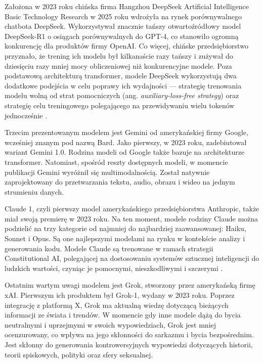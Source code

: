         Założona w 2023 roku chińska firma Hangzhou DeepSeek Artificial Intelligence Basic Technology Research w 2025 roku wdrożyła na rynek porównywalnego chatbota DeepSeek. Wykorzystywał znacznie tańszy otwartoźródłowy model DeepSeek-R1 o osiągach porównywalnych do GPT-4, co stanowiło ogromną konkurencję dla produktów firmy OpenAI. Co więcej, chińske przedsiębiorstwo przyznało, że trening ich modelu był kilkanaście razy tańszy i zużywał do dziesięciu razy mniej mocy obliczeniowej niż konkurencyjne modele. Poza podstawową architekturą transformer, modele DeepSeek wykorzystują dwa dodatkowe podejścia w celu poprawy ich wydajności — strategię trenowania modelu wolną od strat pomocniczych (ang. \textit{auxiliary-loss-free strategy}) oraz strategię celu treningowego polegającego na przewidywaniu wielu tokenów jednocześnie \cite{deepseek_technical_report2024}.

        Trzecim prezentowanym modelem jest Gemini od amerykańskiej firmy Google, wcześniej znanym pod nazwą Bard. Jako pierwszy, w 2023 roku, zadebiutował wariant Gemini 1.0. Rodzina modeli od Google także bazuje na architekturze transformer. Natomiast, spośród reszty dostępnych modeli, w momencie publikacji Gemini wyróżnił się multimodalnością. Został natywnie zaprojektowany do przetwarzania tekstu, audio, obrazu i wideo na jednym strumieniu danych.

        Claude 1, czyli pierwszy model amerykańskiego przedsiębiorstwa Anthropic, także miał swoją premierę w 2023 roku. Na ten moment, modele rodziny Claude można podzielić na trzy kategorie od najmniej do najbardziej zaawansowanej: Haiku, Sonnet i Opus. Są one najlepszymi modelami na rynku w kontekście analizy i generowania kodu. Modele Claude są trenowane w ramach strategii Constitutional AI, polegającej na dostosowaniu systemów sztucznej inteligencji do ludzkich wartości, czyniąc je pomocnymi, nieszkodliwymi i szczerymi \cite{constitutional_ai2022}.
        
        Ostatnim wartym uwagi modelem jest Grok, stworzony przez amerykańską firmę xAI. Pierwszym ich produktem był Grok-1, wydany w 2023 roku. Poprzez integrację z platformą X, Grok ma aktualną wiedzę dotyczącą bieżących informacji ze świata i trendów. W momencie gdy inne modele dążą do bycia neutralnymi i uprzejmymi w swoich wypowiedziach, Grok jest mniej ocenzurowany, co wpływa na jego skłonności do sarkazmu i bycia bezpośrednim. Jest skłonny do generowania kontrowersyjnych wypowiedzi dotyczących historii, teorii spiskowych, polityki oraz sfery seksualnej.


